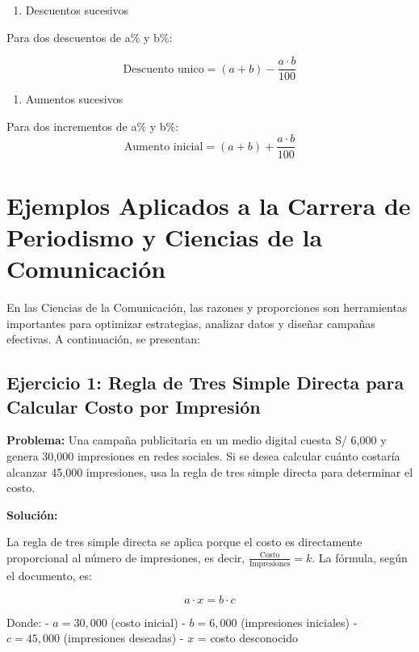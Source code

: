 \documentclass[
  stu,
  floatsintext,
  longtable,
  a4paper,
  nolmodern,
  notxfonts,
  notimes,
  colorlinks=true,linkcolor=blue,citecolor=blue,urlcolor=blue]{apa7}
\providecommand{\tightlist}{%
  \setlength{\itemsep}{0pt}\setlength{\parskip}{0pt}}
\begin{document}
\begin{enumerate}
\def\labelenumi{\alph{enumi}.}
\tightlist
\item
  Descuentos sucesivos
\end{enumerate}

Para dos descuentos de a\% y b\%:

\[
\text{Descuento unico} = (a+b)-\frac{a \cdot b}{100}
\]

\begin{enumerate}
\def\labelenumi{\alph{enumi}.}
\setcounter{enumi}{1}
\tightlist
\item
  Aumentos sucesivos
\end{enumerate}

Para dos incrementos de a\% y b\%: \[  
\text{Aumento inicial} = (a+b)+\frac{a \cdot b}{100}
\]

\section{Ejemplos Aplicados a la Carrera de Periodismo y Ciencias de la
Comunicación}\label{ejemplos-aplicados-a-la-carrera-de-periodismo-y-ciencias-de-la-comunicaciuxf3n}

En las Ciencias de la Comunicación, las razones y proporciones son
herramientas importantes para optimizar estrategias, analizar datos y
diseñar campañas efectivas. A continuación, se presentan:

\subsection{Ejercicio 1: Regla de Tres Simple Directa para Calcular
Costo por
Impresión}\label{ejercicio-1-regla-de-tres-simple-directa-para-calcular-costo-por-impresiuxf3n}

\textbf{Problema:} Una campaña publicitaria en un medio digital cuesta
S/ 6,000 y genera 30,000 impresiones en redes sociales. Si se desea
calcular cuánto costaría alcanzar 45,000 impresiones, usa la regla de
tres simple directa para determinar el costo.

\textbf{Solución:}

La regla de tres simple directa se aplica porque el costo es
directamente proporcional al número de impresiones, es decir,
\(\frac{\text{Costo}}{\text{Impresiones}} = k\). La fórmula, según el
documento, es:

\[
a \cdot x = b \cdot c
\]

Donde: - \(a = 30,000\) (costo inicial) - \(b = 6,000\) (impresiones
iniciales) - \(c = 45,000\) (impresiones deseadas) - \(x\) = costo
desconocido
\end{document}
